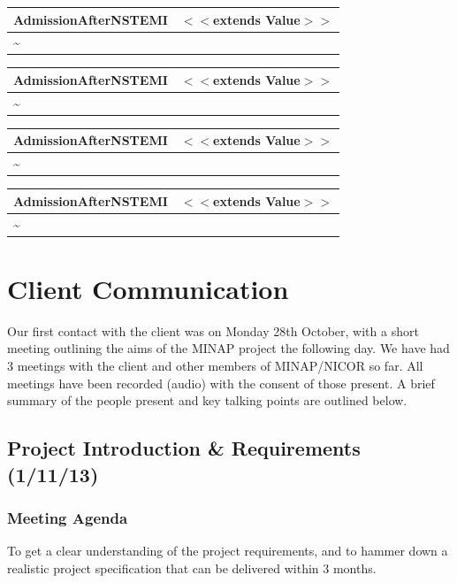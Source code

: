 \documentclass[12pt,a4paper,oneside,titlepage]{article}
\begin{document}
\begin{center}
	\begin{tabular}{| p{13cm} | p{5cm} |}
	\hline
	\textbf{AdmissionAfterNSTEMI} & \textbf{$<<$extends Value$>>$} \\ \hline
	\textasciitilde
	\end{tabular}
\end{center}

\begin{center}
	\begin{tabular}{| p{13cm} | p{5cm} |}
	\hline
	\textbf{AdmissionAfterNSTEMI} & \textbf{$<<$extends Value$>>$} \\ \hline
	\textasciitilde
	\end{tabular}
\end{center}

\begin{center}
	\begin{tabular}{| p{13cm} | p{5cm} |}
	\hline
	\textbf{AdmissionAfterNSTEMI} & \textbf{$<<$extends Value$>>$} \\ \hline
	\textasciitilde
	\end{tabular}
\end{center}

\begin{center}
	\begin{tabular}{| p{13cm} | p{5cm} |}
	\hline
	\textbf{AdmissionAfterNSTEMI} & \textbf{$<<$extends Value$>>$} \\ \hline
	\textasciitilde
	\end{tabular}
\end{center}

\restoregeometry

\newpage
\section{Client Communication}
Our first contact with the client was on Monday 28th October, with a short meeting outlining the aims of the MINAP project the following day. We have had 3 meetings with the client and other members of MINAP/NICOR so far. All meetings have been recorded (audio) with the consent of those present. A brief summary of the people present and key talking points are outlined below.
\subsection{Project Introduction \& Requirements (1/11/13)}
\subsubsection{Meeting Agenda}
To get a clear understanding of the project requirements, and to hammer down a realistic project specification that can be delivered within 3 months. 
\end{document}
